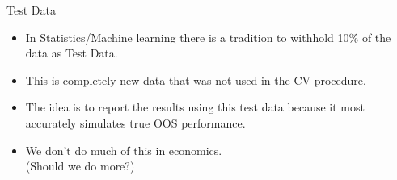 \documentclass[11pt,handout,xcolor=pdftex,dvipsnames,table,mathserif,aspectratio=169]{beamer}
\begin{document}
\begin{frame}{Test Data}
\begin{itemize}
\item In Statistics/Machine learning there is a tradition to withhold 10\% of the data as \alert{Test Data}.
\item This is \alert{completely new data} that was not used in the CV procedure.
\item The idea is to report the results using this test data because it most accurately simulates true OOS performance.
\item We don't do much of this in economics.\\
 (Should we do more?)
\end{itemize}
\end{frame}
\end{document}
